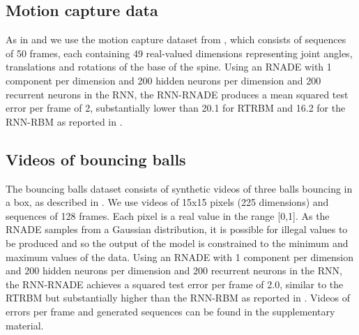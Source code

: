 \documentclass{article} %
\begin{document}
\subsection{Motion capture data}
As in \cite{Sutskever2008} and \cite{Boulanger-Lewandowski2012} we use the motion capture dataset from \cite{Sutskever2008}, which consists of sequences of 50 frames, each containing 49 real-valued dimensions representing joint angles, translations and rotations of the base of the spine. Using an RNADE with 1 component per dimension and 200 hidden neurons per dimension and 200 recurrent neurons in the RNN, the RNN-RNADE produces a mean squared test error per frame of 2, substantially lower than 20.1 for RTRBM and 16.2 for the RNN-RBM as reported in \cite{Boulanger-Lewandowski2012}.

\subsection{Videos of bouncing balls}
The bouncing balls dataset consists of synthetic videos of three balls bouncing in a box, as described in \cite{Sutskever2008}. We use videos of 15x15 pixels (225 dimensions) and sequences of 128 frames. Each pixel is a real value in the range [0,1]. As the RNADE samples from a Gaussian distribution, it is possible for illegal values to be produced and so the output of the model is constrained to the minimum and maximum values of the data. Using an RNADE with 1 component per dimension and 200 hidden neurons per dimension and 200 recurrent neurons in the RNN, the RNN-RNADE achieves a squared test error per frame of 2.0, similar to the RTRBM but substantially higher than the RNN-RBM as reported in \cite{Boulanger-Lewandowski2012}. Videos of errors per frame and generated sequences can be found in the supplementary material.





\end{document}
